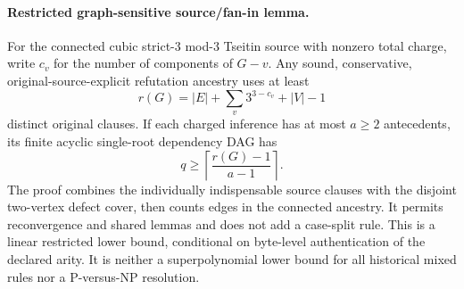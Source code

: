 \paragraph{Restricted graph-sensitive source/fan-in lemma.}
For the connected cubic strict-$3$ mod-$3$ Tseitin source with nonzero total
charge, write $c_v$ for the number of components of $G-v$.  Any sound,
conservative, original-source-explicit refutation ancestry uses at least
\[
 r(G)=|E|+\sum_v3^{3-c_v}+|V|-1
\]
distinct original clauses.  If each charged inference has at most $a\ge2$
antecedents, its finite acyclic single-root dependency DAG has
\[
 q\ge\left\lceil\frac{r(G)-1}{a-1}\right\rceil.
\]
The proof combines the individually indispensable source clauses with the
disjoint two-vertex defect cover, then counts edges in the connected ancestry.
It permits reconvergence and shared lemmas and does not add a case-split rule.
This is a linear restricted lower bound, conditional on byte-level
authentication of the declared arity.  It is neither a superpolynomial
lower bound for all historical mixed rules nor a P-versus-NP resolution.
